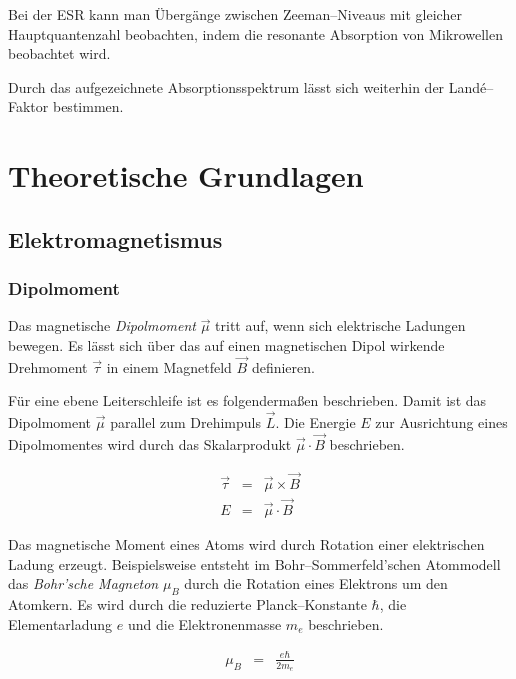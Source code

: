 \documentclass[12pt,a4paper]{scrartcl}
\numberwithin{equation}{section} %
\begin{document}
Bei der ESR kann man Übergänge zwischen Zeeman--Niveaus mit gleicher
Hauptquantenzahl beobachten, indem die resonante Absorption von
Mikrowellen beobachtet wird.

Durch das aufgezeichnete Absorptionsspektrum lässt sich weiterhin der
Landé--Faktor bestimmen.

\clearpage
\hypertarget{theoretische-grundlagen}{%
\section{Theoretische Grundlagen}\label{theoretische-grundlagen}}

\hypertarget{elektromagnetismus}{%
\subsection{Elektromagnetismus}\label{elektromagnetismus}}

\hypertarget{dipolmoment}{%
\subsubsection{Dipolmoment}\label{dipolmoment}}

Das magnetische \emph{Dipolmoment} $\vec \mu$ tritt auf, wenn sich
elektrische Ladungen bewegen. Es lässt sich über das auf einen
magnetischen Dipol wirkende Drehmoment $\vec \tau$ in einem Magnetfeld
$\vec B$ definieren.

Für eine ebene Leiterschleife ist es folgendermaßen beschrieben.
\cite{Jackson} Damit ist das Dipolmoment $\vec \mu$ parallel zum
Drehimpuls $\vec{L}$. Die Energie $E$ zur Ausrichtung eines
Dipolmomentes wird durch das Skalarprodukt $\vec \mu \cdot \vec B$
beschrieben.

\begin{eqnarray}
    \vec \tau &=& \vec \mu \times \vec B \\
    E &=& \vec \mu \cdot \vec B \label{eq:EDipol}
\end{eqnarray}

Das magnetische Moment eines Atoms wird durch Rotation einer
elektrischen Ladung erzeugt. Beispielsweise entsteht im
Bohr--Sommerfeld'schen Atommodell das \emph{Bohr'sche Magneton}
$\mu_B$ durch die Rotation eines Elektrons um den Atomkern. Es wird
durch die reduzierte Planck--Konstante $\hbar$, die Elementarladung
$e$ und die Elektronenmasse $m_e$ beschrieben.

\begin{eqnarray}
    \mu_B &=& \frac{e\hbar}{2m_e}
\end{eqnarray}
\end{document}
